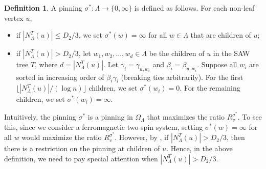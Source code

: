 \documentclass[11pt]{amsart}
\newcommand{\nbd}[2]{N_{#1}^{#2}}
\theoremstyle{definition}
\newtheorem{definition}[theorem]{Definition}
\theoremstyle{remark}
\begin{document}
\begin{definition}\label{def:universal-pinning}
A pinning $\sigma^*: \Lambda \to \{0,\infty\}$ is defined as follows. For each non-leaf vertex $u$,
\begin{itemize}
  \item if $|N_\Lambda^T(u)| \leq D_2 / 3$, we set $\sigma^*(w) = \infty$ for all $w \in \Lambda$ that are children of $u$;
  \item if $|N_\Lambda^T(u)| > D_2 / 3$, let $w_1,w_2,\ldots,w_d \in \Lambda$ be the children of $u$ in the SAW tree $T$, where $d = |N_\Lambda^T(u)|$. Let $\gamma_i = \gamma_{u,w_i}$ and $\beta_i = \beta_{u,w_i}$. Suppose all $w_i$ are sorted in increasing order of $\beta_i\gamma_i$ (breaking ties arbitrarily). For the first $\lfloor |N^T_\Lambda(u)|/(\log n)  \rfloor$ children, we set $\sigma^*(w_i) = 0$. For the remaining children, we set $\sigma^*(w_i) = \infty$.
\end{itemize}
\end{definition}

Intuitively, the pinning $\sigma^*$ is a pinning in $\Omega_\Lambda$ that maximizes the ratio $R^{\sigma^*}_v$. To see this, since we consider a ferromagnetic two-spin system, setting $\sigma^*(w) = \infty$ for all $w$ would maximize the ratio $R^{\sigma^*}_v$. However, by , if $|\nbd{\Lambda}{T}(u)| > D_2 / 3$, then there is a restriction on the pinning at children of $u$. Hence, in the above definition, we need to pay special attention when $|\nbd{\Lambda}{T}(u)| > D_2 / 3$.
\end{document}
